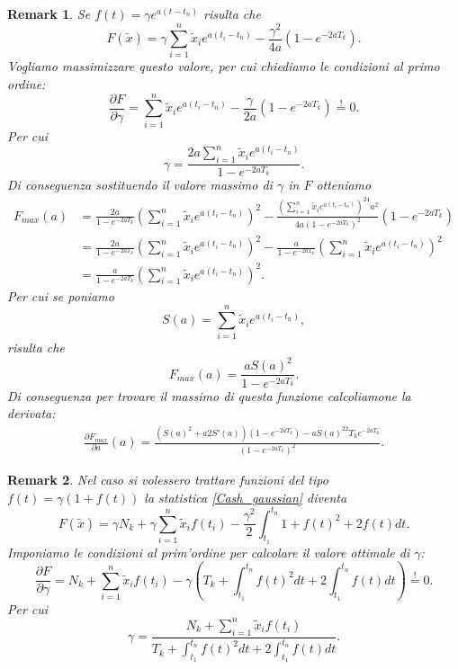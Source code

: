 \documentclass[10pt,a4paper]{report}
\newtheorem{remark}{Remark}
\begin{document}
\begin{remark}
Se $f(t)=\gamma e^{a(t-t_n)}$ risulta che
$$
F(\tilde{x}) = \gamma\sum_{i=1}^n\tilde{x}_ie^{a(t_i-t_n)}-\frac{\gamma^2}{4a}(1-e^{-2aT_k}).
$$
Vogliamo massimizzare questo valore, per cui chiediamo le condizioni al primo ordine:
\begin{equation*}
\frac{\partial F}{\partial\gamma} = \sum_{i=1}^n\tilde{x}_ie^{a(t_i-t_n)}-\frac{\gamma}{2a}(1-e^{-2aT_k})\stackrel{!}{=}0.
\end{equation*}
Per cui
$$
\gamma = \frac{2a\sum_{i=1}^n\tilde{x}_ie^{a(t_i-t_n)}}{1-e^{-2aT_k}}.
$$
Di conseguenza sostituendo il valore massimo di $\gamma$ in $F$ otteniamo
\begin{align*}
F_{max}(a) &= \frac{2a}{1-e^{-2aT_k}}\left(\sum_{i=1}^n\tilde{x}_ie^{a(t_i-t_n)}\right)^2-\frac{\left(\sum_{i=1}^n\tilde{x}_ie^{a(t_i-t_n)}\right)^24a^2}{4a(1-e^{-2aT_k})^2}(1-e^{-2aT_k})\\
&= \frac{2a}{1-e^{-2aT_k}}\left(\sum_{i=1}^n\tilde{x}_ie^{a(t_i-t_n)}\right)^2-\frac{a}{1-e^{-2aT_k}}\left(\sum_{i=1}^n\tilde{x}_ie^{a(t_i-t_n)}\right)^2\\
&= \frac{a}{1-e^{-2aT_k}}\left(\sum_{i=1}^n\tilde{x}_ie^{a(t_i-t_n)}\right)^2.
\end{align*}
Per cui se poniamo
$$
S(a) = \sum_{i=1}^n\tilde{x}_ie^{a(t_i-t_n)},
$$
risulta che
$$
F_{max}(a) = \frac{aS(a)^2}{1-e^{-2aT_k}}.
$$
Di conseguenza per trovare il massimo di questa funzione calcoliamone la derivata:
\begin{gather*}
\frac{\partial F_{max}}{\partial a}(a)=\frac{\left(S(a)^2+a2S'(a)\right)(1-e^{-2aT_k})-aS(a)^22T_ke^{-2aT_k}}{(1-e^{-2aT_k})^2}.
\end{gather*}
\end{remark}
\begin{remark}
Nel caso si volessero trattare funzioni del tipo $f(t)=\gamma(1+f(t))$ la statistica \eqref{Cash_gaussian} diventa
$$
F(\tilde{x}) = \gamma N_k+\gamma\sum_{i=1}^n\tilde{x}_if(t_i)-\frac{\gamma^2}{2}\int_{t_1}^{t_n}1+f(t)^2+2f(t)dt.
$$
Imponiamo le condizioni al prim'ordine per calcolare il valore ottimale di $\gamma$:
$$
\frac{\partial F}{\partial\gamma} = N_k+\sum_{i=1}^n\tilde{x}_if(t_i)-\gamma\left(T_k+\int_{t_1}^{t_n}f(t)^2dt+2\int_{t_1}^{t_n}f(t)dt\right)\stackrel{!}{=}0.
$$
Per cui
$$
\gamma = \frac{N_k+\sum_{i=1}^n\tilde{x}_if(t_i)}{T_k+\int_{t_1}^{t_n}f(t)^2dt+2\int_{t_1}^{t_n}f(t)dt}.
$$
\end{remark}
\end{document}
